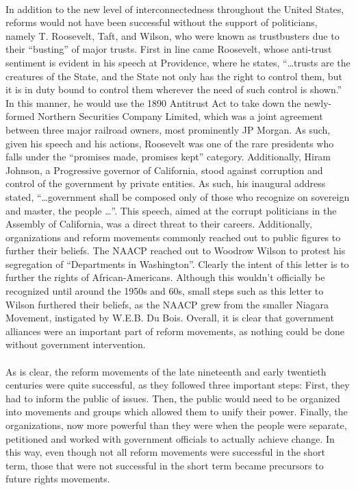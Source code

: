 \documentclass[12pt]{article}
\begin{document}
\paragraph{} In addition to the new level of interconnectedness throughout the United States, reforms would not have been successful without the support of politicians, namely T. Roosevelt, Taft, and Wilson, who were known as trustbusters due to their ``busting'' of major trusts. First in line came Roosevelt, whose anti-trust sentiment is evident in his speech at Providence, where he states, ``\dots trusts are the creatures of the State, and the State not only has the right to control them, but it is in duty bound to control them wherever the need of such control is shown.'' In this manner, he would use the 1890 Antitrust Act to take down the newly-formed Northern Securities Company Limited, which was a joint agreement between three major railroad owners, most prominently JP Morgan. As such, given his speech and his actions, Roosevelt was one of the rare presidents who falls under the ``promises made, promises kept'' category. Additionally, Hiram Johnson, a Progressive governor of California, stood against corruption and control of the government by private entities. As such, his inaugural address stated, ``\dots government shall be composed only of those who recognize on sovereign and master, the people \dots''. This speech, aimed at the corrupt politicians in the Assembly of California, was a direct threat to their careers. Additionally, organizations and reform movements commonly reached out to public figures to further their beliefs. The NAACP reached out to Woodrow Wilson to protest his segregation of ``Departments in Washington''. Clearly the intent of this letter is to further the rights of African-Americans. Although this wouldn't officially be recognized until around the 1950s and 60s, small steps such as this letter to Wilson furthered their beliefs, as the NAACP grew from the smaller Niagara Movement, instigated by W.E.B. Du Bois. Overall, it is clear that government alliances were an important part of reform movements, as nothing could be done without government intervention.

\paragraph{} As is clear, the reform movements of the late nineteenth and early twentieth centuries were quite successful, as they followed three important steps: First, they had to inform the public of issues. Then, the public would need to be organized into movements and groups which allowed them to unify their power. Finally, the organizations, now more powerful than they were when the people were separate, petitioned and worked with government officials to actually achieve change. In this way, even though not all reform movements were successful in the short term, those that were not successful in the short term became precursors to future rights movements.
\end{document}
